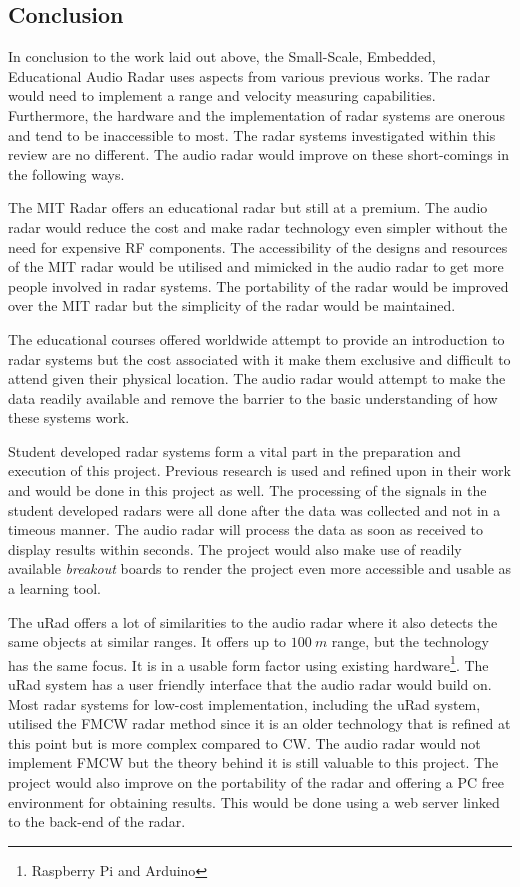 \subsection{Conclusion}
In conclusion to the work laid out above, the Small-Scale, Embedded, Educational Audio Radar uses aspects from various previous works. The radar would need to implement a range and velocity measuring capabilities. Furthermore, the hardware and the implementation of radar systems are onerous and tend to be inaccessible to most. The radar systems investigated within this review are no different. The audio radar would improve on these short-comings in the following ways.

The MIT Radar offers an educational radar but still at a premium. The audio radar would reduce the cost and make radar technology even simpler without the need for expensive RF components. The accessibility of the designs and resources of the MIT radar would be utilised and mimicked in the audio radar to get more people involved in radar systems. The portability of the radar would be improved over the MIT radar but the simplicity of the radar would be maintained.

The educational courses offered worldwide attempt to provide an introduction to radar systems but the cost associated with it make them exclusive and difficult to attend given their physical location. The audio radar would attempt to make the data readily available and remove the barrier to the basic understanding of how these systems work.

Student developed radar systems form a vital part in the preparation and execution of this project. Previous research is used and refined upon in their work and would be done in this project as well. The processing of the signals in the student developed radars were all done after the data was collected and not in a timeous manner. The audio radar will process the data as soon as received to display results within seconds. The project would also make use of readily available \textit{breakout} boards to render the project even more accessible and usable as a learning tool.

The uRad offers a lot of similarities to the audio radar where it also detects the same objects at similar ranges. It offers up to $100\ m$ range, but the technology has the same focus. It is in a usable form factor using existing hardware\footnote{Raspberry Pi and Arduino}. The uRad system has a user friendly interface that the audio radar would build on. Most radar systems for low-cost implementation, including the uRad system, utilised the FMCW radar method since it is an older technology that is refined at this point but is more complex compared to CW. The audio radar would not implement FMCW but the theory behind it is still valuable to this project. The project would also improve on the portability of the radar and offering a PC free environment for obtaining results. This would be done using a web server linked to the back-end of the radar.


\newpage